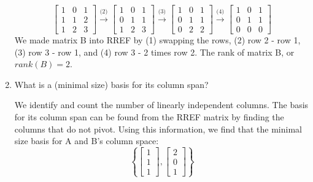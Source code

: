 \documentclass{article}
\begin{document}
\begin{aprob}
\begin{enumerate}
\begin{equation}
    	    \begin{bmatrix} 1 & 0 & 1 \\ 1 & 1 & 2 \\ 1 & 2 & 3 \end{bmatrix} \xrightarrow{\text{(2)}}
    	    \begin{bmatrix} 1 & 0 & 1 \\ 0 & 1 & 1 \\ 1 & 2 & 3 \end{bmatrix} \xrightarrow{\text{(3)}}
    	    \begin{bmatrix} 1 & 0 & 1 \\ 0 & 1 & 1 \\ 0 & 2 & 2 \end{bmatrix} \xrightarrow{\text{(4)}}
    	    \begin{bmatrix} 1 & 0 & 1 \\ 0 & 1 & 1 \\ 0 & 0 & 0 \end{bmatrix}
    	\end{equation}
    	We made matrix B into RREF by (1) swapping the rows, (2) row 2 - row 1, (3) row 3 - row 1, and (4) row 3 - 2 times row 2. The rank of matrix B, or $rank(B) = 2$.
    	\item {} What is a (minimal size) basis for its column span?
    	
    	We identify and count the number of linearly independent columns. The basis for its column span can be found from the RREF matrix by finding the columns that do not pivot. Using this information, we find that the minimal size basis for A and B's column space:
    	$$\left\{\begin{bmatrix} 1 \\ 1 \\ 1 \end{bmatrix}, \begin{bmatrix} 2 \\ 0 \\ 1 \end{bmatrix} \right\}$$

    \end{enumerate}
\end{aprob}
\noindent\makebox[\linewidth]{\rule{\textwidth}{0.4pt}}
\end{document}
